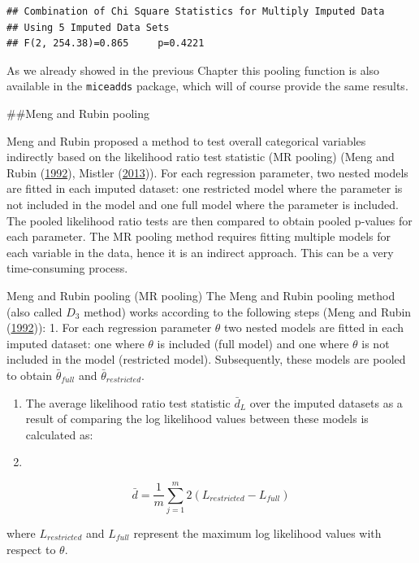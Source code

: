 \documentclass[
]{book}
\begin{document}
\begin{verbatim}
## Combination of Chi Square Statistics for Multiply Imputed Data
## Using 5 Imputed Data Sets
## F(2, 254.38)=0.865     p=0.4221
\end{verbatim}

As we already showed in the previous Chapter this pooling function is
also available in the \texttt{miceadds} package, which will of course
provide the same results.

\#\#Meng and Rubin pooling

Meng and Rubin proposed a method to test overall categorical variables
indirectly based on the likelihood ratio test statistic (MR pooling)
(Meng and Rubin (\protect\hyperlink{ref-Meng1992}{1992}), Mistler
(\protect\hyperlink{ref-Mistler2013}{2013})). For each regression
parameter, two nested models are fitted in each imputed dataset: one
restricted model where the parameter is not included in the model and
one full model where the parameter is included. The pooled likelihood
ratio tests are then compared to obtain pooled p-values for each
parameter. The MR pooling method requires fitting multiple models for
each variable in the data, hence it is an indirect approach. This can be
a very time-consuming process.

Meng and Rubin pooling (MR pooling) The Meng and Rubin pooling method
(also called \(D_3\) method) works according to the following steps
(Meng and Rubin (\protect\hyperlink{ref-Meng1992}{1992})): 1. For each
regression parameter \(\theta\) two nested models are fitted in each
imputed dataset: one where \(\theta\) is included (full model) and one
where \(\theta\) is not included in the model (restricted model).
Subsequently, these models are pooled to obtain \(\bar\theta_{full}\)
and \(\bar\theta_{restricted}\).

\begin{enumerate}
\def\labelenumi{\arabic{enumi}.}
\setcounter{enumi}{1}
\item
  The average likelihood ratio test statistic \(\bar d_L\) over the
  imputed datasets as a result of comparing the log likelihood values
  between these models is calculated as:
\item
\end{enumerate}

\[\bar d = \frac{1}{m} \sum_{j=1}^m 2(L_{restricted} - L_{full})\]

where \(L_{restricted}\) and \(L_{full}\) represent the maximum log
likelihood values with respect to \(\theta\).
\end{document}
